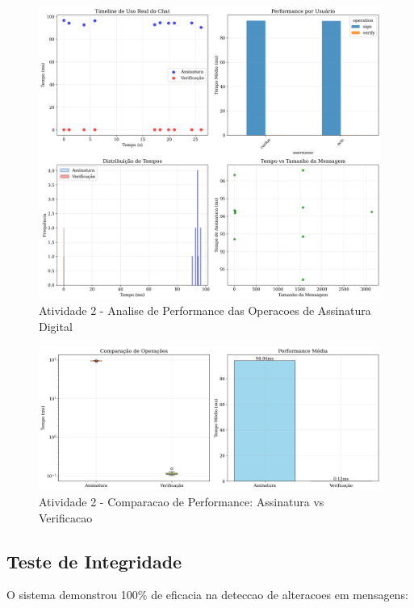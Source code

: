 \documentclass[12pt,a4paper,oneside]{article}
\begin{document}
\begin{figure}[H]
\centering
\includegraphics[width=\textwidth]{atividade2/results/chat_performance_analysis.png}
\caption{Atividade 2 - Analise de Performance das Operacoes de Assinatura Digital}
\label{fig:signature_performance}
\end{figure}

\begin{figure}[H]
\centering
\includegraphics[width=\textwidth]{atividade2/results/chat_operations_comparison.png}
\caption{Atividade 2 - Comparacao de Performance: Assinatura vs Verificacao}
\label{fig:signature_comparison}
\end{figure}

\subsection{Teste de Integridade}

O sistema demonstrou 100\% de eficacia na deteccao de alteracoes em mensagens:
\end{document}
